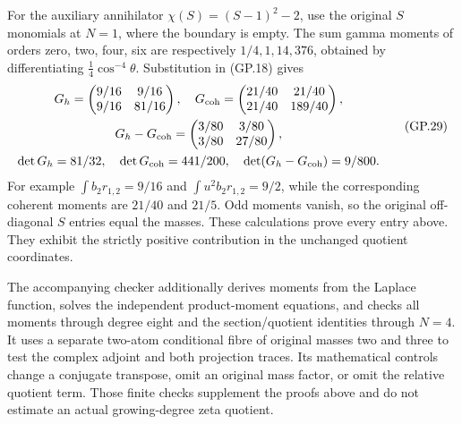 \documentclass[11pt]{article}
\begin{document}
For the auxiliary annihilator $\chi(S)=(S-1)^2-2$, use the original
$S$ monomials at $N=1$, where the boundary is empty. The sum gamma
moments of orders zero, two, four, six are respectively
$1/4,1,14,376$, obtained by differentiating
$\tfrac14\cos^{-4}\theta$. Substitution in (GP.18) gives
\begin{equation}
 \begin{gathered}
 G_h=\begin{pmatrix}9/16&9/16\\9/16&81/16\end{pmatrix},\quad
 G_{\rm coh}=\begin{pmatrix}21/40&21/40\\21/40&189/40\end{pmatrix},\\
 G_h-G_{\rm coh}=\begin{pmatrix}3/80&3/80\\3/80&27/80\end{pmatrix},\\
 \det G_h=81/32,\quad\det G_{\rm coh}=441/200,\quad
 \det(G_h-G_{\rm coh})=9/800.
 \end{gathered}
 \tag{GP.29}
\end{equation}
For example $\int b_2r_{1,2}=9/16$ and
$\int u^2b_2r_{1,2}=9/2$, while the corresponding coherent moments
are $21/40$ and $21/5$. Odd moments vanish, so the original
off-diagonal $S$ entries equal the masses. These calculations prove
every entry above. They exhibit the strictly positive contribution
in the unchanged quotient coordinates.

The accompanying checker additionally derives moments from the Laplace
function, solves the independent product-moment equations, and checks
all moments through degree eight and the section/quotient identities
through $N=4$. It uses a separate two-atom conditional fibre of original
masses two and three to test the complex adjoint and both projection
traces. Its mathematical controls change a conjugate transpose, omit
an original mass factor, or omit the relative quotient term. Those
finite checks supplement the proofs above and do not estimate an
actual growing-degree zeta quotient.
\end{document}
